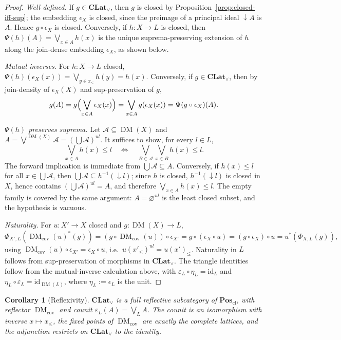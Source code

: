 \documentclass{amsart}
\theoremstyle{plain}
\newtheorem{corollary}{Corollary}[section]
\theoremstyle{definition}
\theoremstyle{remark}
\DeclareMathOperator{\DM}{DM}
\begin{document}
\begin{proof}
\emph{Well defined.} If $g\in\mathbf{CLat}_\vee$, then $g$ is closed by Proposition~\ref{prop:closed-iff-sup}; the embedding $\epsilon_X$ is closed, since the preimage of a principal ideal $\downarrow A$ is $A$. Hence $g\circ\epsilon_X$ is closed. Conversely, if $h\colon X\to L$ is closed, then $\Psi(h)(A)=\bigvee_{x\in A}h(x)$ is the unique suprema-preserving extension of $h$ along the join-dense embedding $\epsilon_X$, as shown below.

\emph{Mutual inverses.} For $h\colon X\to L$ closed, $\Psi(h)(\epsilon_X(x))=\bigvee_{y\in x_\leq}h(y)=h(x)$. Conversely, if $g\in\mathbf{CLat}_\vee$, then by join-density of $\epsilon_X(X)$ and sup-preservation of $g$,
\[
g(A)=g\Bigl(\bigvee_{x\in A}\epsilon_X(x)\Bigr)=\bigvee_{x\in A}g(\epsilon_X(x))=\Psi(g\circ\epsilon_X)(A).
\]

\emph{$\Psi(h)$ preserves suprema.} Let $\mathcal{A}\subseteq\DM(X)$ and $A=\bigvee^{\DM(X)}\mathcal{A}=(\bigcup\mathcal{A})^{ul}$. It suffices to show, for every $l\in L$,
\[
\bigvee_{x\in A}h(x)\leq l \quad\Longleftrightarrow\quad \bigvee_{B\in\mathcal{A}}\bigvee_{x\in B}h(x)\leq l.
\]
The forward implication is immediate from $\bigcup\mathcal{A}\subseteq A$. Conversely, if $h(x)\leq l$ for all $x\in\bigcup\mathcal{A}$, then $\bigcup\mathcal{A}\subseteq h^{-1}(\downarrow l)$; since $h$ is closed, $h^{-1}(\downarrow l)$ is closed in $X$, hence contains $(\bigcup\mathcal{A})^{ul}=A$, and therefore $\bigvee_{x\in A}h(x)\leq l$. The empty family is covered by the same argument: $A=\varnothing^{ul}$ is the least closed subset, and the hypothesis is vacuous.

\emph{Naturality.} For $u\colon X'\to X$ closed and $g\colon\DM(X)\to L$,
\[
\Phi_{X',L}(\DM_{\mathrm{cov}}(u)^*(g))=(g\circ\DM_{\mathrm{cov}}(u))\circ\epsilon_{X'}=g\circ(\epsilon_X\circ u)=(g\circ\epsilon_X)\circ u=u^*(\Phi_{X,L}(g)),
\]
using $\DM_{\mathrm{cov}}(u)\circ\epsilon_{X'}=\epsilon_X\circ u$, i.e.\ $u(x'_\leq)^{ul}=u(x')_\leq$. Naturality in $L$ follows from sup-preservation of morphisms in $\mathbf{CLat}_\vee$. The triangle identities follow from the mutual-inverse calculation above, with $\varepsilon_L\circ\eta_L=\mathrm{id}_L$ and $\eta_L\circ\varepsilon_L=\mathrm{id}_{\DM(L)}$, where $\eta_L := \epsilon_L$ is the unit.
\end{proof}

\begin{corollary}[Reflexivity]\label{cor:reflexive}
$\mathbf{CLat}_\vee$ is a full reflective subcategory of $\mathbf{Pos}_{\mathrm{cl}}$, with reflector $\DM_{\mathrm{cov}}$ and counit $\varepsilon_L(A)=\bigvee_L A$. The counit is an isomorphism with inverse $x\mapsto x_\leq$, the fixed points of $\DM_{\mathrm{cov}}$ are exactly the complete lattices, and the adjunction restricts on $\mathbf{CLat}_\vee$ to the identity.
\end{corollary}
\end{document}
